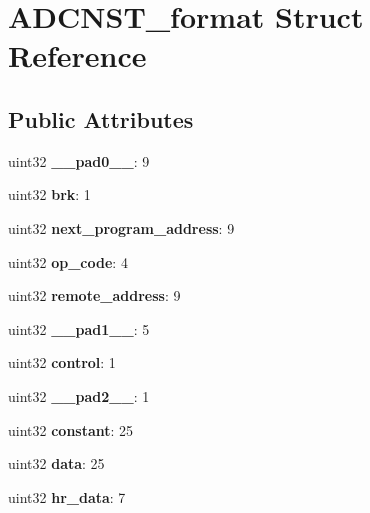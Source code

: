 \hypertarget{structADCNST__format}{}\section{A\+D\+C\+N\+S\+T\+\_\+format Struct Reference}
\label{structADCNST__format}
\subsection*{Public Attributes}
\begin{DoxyCompactItemize}
\item 
\mbox{\label{structADCNST__format_a34f1403004dae6b9e5a31504797745b8}} 
uint32 {\bfseries \+\_\+\+\_\+pad0\+\_\+\+\_\+}\+: 9
\item 
\mbox{\label{structADCNST__format_af252211e11badba1eb6a212757c783ac}} 
uint32 {\bfseries brk}\+: 1
\item 
\mbox{\label{structADCNST__format_aba7e6480db3dc3d35de5a703e8a97230}} 
uint32 {\bfseries next\+\_\+program\+\_\+address}\+: 9
\item 
\mbox{\label{structADCNST__format_a4950078f7c6bc7de8daeb4ac9c8c3f0d}} 
uint32 {\bfseries op\+\_\+code}\+: 4
\item 
\mbox{\label{structADCNST__format_a7e62a1e4018a3c10be57fadd92036419}} 
uint32 {\bfseries remote\+\_\+address}\+: 9
\item 
\mbox{\label{structADCNST__format_afb81ee93ed789de3d2e7240f26bfe663}} 
uint32 {\bfseries \+\_\+\+\_\+pad1\+\_\+\+\_\+}\+: 5
\item 
\mbox{\label{structADCNST__format_a13314a407ec852f8e8e570a11ea2ae9e}} 
uint32 {\bfseries control}\+: 1
\item 
\mbox{\label{structADCNST__format_ab32e6ba1ad92bef760866b53f37c31ae}} 
uint32 {\bfseries \+\_\+\+\_\+pad2\+\_\+\+\_\+}\+: 1
\item 
\mbox{\label{structADCNST__format_ac89d121e414bc11695dd576d0284e164}} 
uint32 {\bfseries constant}\+: 25
\item 
\mbox{\label{structADCNST__format_a536d738775ee2ce3356f40ec14a8d5aa}} 
uint32 {\bfseries data}\+: 25
\item 
\mbox{\label{structADCNST__format_aaff7065a3ed8dc5b813aedcc43e1d6e2}} 
uint32 {\bfseries hr\+\_\+data}\+: 7
\end{DoxyCompactItemize}


